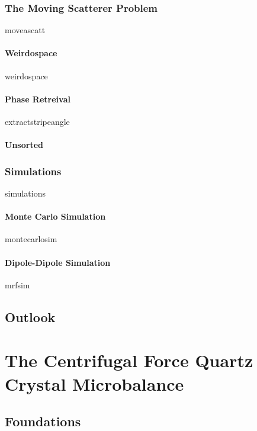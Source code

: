 \documentclass[a4paper,titlepage,onecolumn]{report}
\begin{document}
\section{The Moving Scatterer Problem}
{moveascatt}
\subsection{Weirdospace}
{weirdospace}
\subsection{Phase Retreival}
{extractstripeangle}
\subsection{Unsorted}
\section{Simulations}
{simulations}
\subsection{Monte Carlo Simulation} \label{sec:montecarlo}
{montecarlosim}
\subsection{Dipole-Dipole Simulation} \label{sec:mrfsim}
{mrfsim}
\chapter{Outlook} \label{ch:outlook}

\part{The Centrifugal Force Quartz Crystal Microbalance}
\chapter{Foundations} \label{ch:qcmfoundations}
\end{document}
